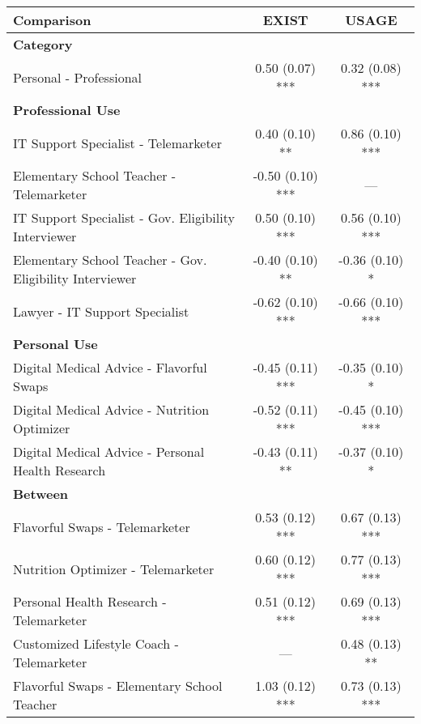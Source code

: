 \begin{table}[h]
\small
\begin{center}
    \begin{tabular}{lcc}
        \toprule
        \textbf{Comparison} & \textbf{EXIST} & \textbf{USAGE} \\
        \midrule
        \multicolumn{3}{l}{\textbf{Category}}\\

        Personal - Professional & 0.50 (0.07) *** & 0.32 (0.08) *** \\
        \hline
        \multicolumn{3}{l}{\textbf{Professional Use}}\\
        IT Support Specialist - Telemarketer            & 0.40 (0.10) **  & 0.86 (0.10) *** \\
        Elementary School Teacher - Telemarketer        & -0.50 (0.10) *** & --- \\
        IT Support Specialist - Gov. Eligibility Interviewer & 0.50 (0.10) *** & 0.56 (0.10) *** \\
        Elementary School Teacher - Gov. Eligibility Interviewer & -0.40 (0.10) ** & -0.36 (0.10) * \\
        Lawyer - IT Support Specialist & -0.62 (0.10) *** & -0.66 (0.10) *** \\
        \hline
        \multicolumn{3}{l}{\textbf{Personal Use}}\\
        Digital Medical Advice - Flavorful Swaps & -0.45 (0.11) *** & -0.35 (0.10) * \\
        Digital Medical Advice - Nutrition Optimizer & -0.52 (0.11) *** & -0.45 (0.10) *** \\
        Digital Medical Advice - Personal Health Research & -0.43 (0.11) ** & -0.37 (0.10) * \\
        \hline
        \multicolumn{3}{l}{\textbf{Between}}\\
        Flavorful Swaps - Telemarketer                  & 0.53 (0.12) ***  & 0.67 (0.13) *** \\
        Nutrition Optimizer - Telemarketer              & 0.60 (0.12) ***  & 0.77 (0.13) *** \\
        Personal Health Research - Telemarketer         & 0.51 (0.12) ***  & 0.69 (0.13) *** \\
        Customized Lifestyle Coach - Telemarketer       & ---              & 0.48 (0.13) **  \\
        Flavorful Swaps - Elementary School Teacher & 1.03 (0.12) *** & 0.73 (0.13) *** \\

\end{tabular}
\end{center}
\end{table}
